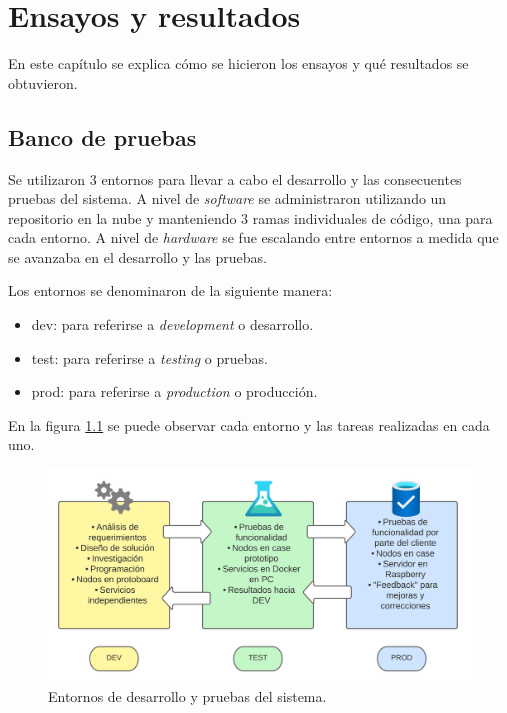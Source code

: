 
\chapter{Ensayos y resultados} %

\label{Chapter4} %

En este capítulo se explica cómo se hicieron los ensayos y qué resultados se obtuvieron.

\section{Banco de pruebas}
\label{sec:entornos}

Se utilizaron 3 entornos para llevar a cabo el desarrollo y las consecuentes pruebas del sistema. A nivel de \textit{software} se administraron utilizando un repositorio en la nube y manteniendo 3 ramas individuales de código, una para cada entorno. A nivel de \textit{hardware} se fue escalando entre entornos a medida que se avanzaba en el desarrollo y las pruebas.

Los entornos se denominaron de la siguiente manera:
\begin{itemize}
\item dev: para referirse a \textit{development} o desarrollo.
\item test: para referirse a \textit{testing} o pruebas.
\item prod: para referirse a \textit{production} o producción.
\end{itemize}

En la figura \ref{fig:entornos} se puede observar cada entorno y las tareas realizadas en cada uno.

\begin{figure}[H]
	\centering
	\includegraphics[scale=.15]{./Figures/diagrama-entornos.png}
	\caption{Entornos de desarrollo y pruebas del sistema.}
	\label{fig:entornos}
\end{figure}

